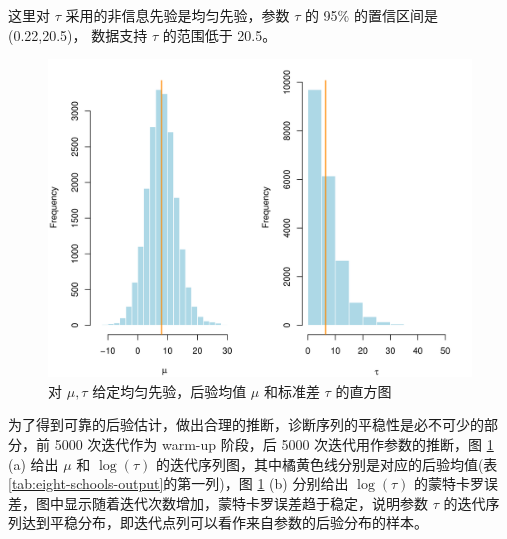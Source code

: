 \documentclass[12pt,a4paper,UTF8,twoside]{book}
\theoremstyle{definition}
\theoremstyle{definition}
\theoremstyle{definition}
\theoremstyle{remark}
\begin{document}
这里对 \(\tau\) 采用的非信息先验是均匀先验，参数 \(\tau\) 的 95\%
的置信区间是 (0.22,20.5)， 数据支持 \(\tau\) 的范围低于 20.5。

\begin{figure}

{\centering \includegraphics[width=0.7\linewidth]{figures/posterior_mu_tau} 

}

\caption{对 $\mu,\tau$ 给定均匀先验，后验均值 $\mu$ 和标准差 $\tau$ 的直方图}\label{fig:posterior-mu-tau}
\end{figure}

为了得到可靠的后验估计，做出合理的推断，诊断序列的平稳性是必不可少的部分，前
5000 次迭代作为 warm-up 阶段，后 5000 次迭代用作参数的推断，图
\ref{fig:posterior-mu-tau} (a) 给出 \(\mu\) 和 \(\log(\tau)\)
的迭代序列图，其中橘黄色线分别是对应的后验均值(表
\ref{tab:eight-schools-output}的第一列)，图 \ref{fig:posterior-mu-tau}
(b) 分别给出 \(\log(\tau)\)
的蒙特卡罗误差，图中显示随着迭代次数增加，蒙特卡罗误差趋于稳定，说明参数
\(\tau\)
的迭代序列达到平稳分布，即迭代点列可以看作来自参数的后验分布的样本。
\end{document}
